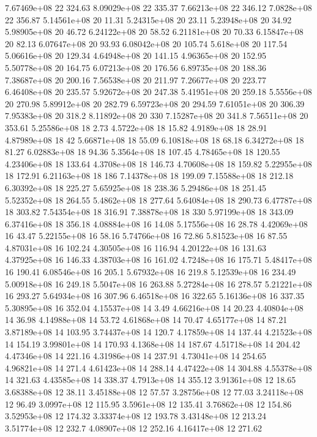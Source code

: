 7.67469e+08 22 324.63
8.09029e+08 22 335.37
7.66213e+08 22 346.12
7.0828e+08 22 356.87
5.14561e+08 20 11.31
5.24315e+08 20 23.11
5.23948e+08 20 34.92
5.98905e+08 20 46.72
6.24122e+08 20 58.52
6.21181e+08 20 70.33
6.15847e+08 20 82.13
6.07647e+08 20 93.93
6.08042e+08 20 105.74
5.618e+08 20 117.54
5.06616e+08 20 129.34
4.64948e+08 20 141.15
4.96365e+08 20 152.95
5.50778e+08 20 164.75
6.07213e+08 20 176.56
6.89735e+08 20 188.36
7.38687e+08 20 200.16
7.56538e+08 20 211.97
7.26677e+08 20 223.77
6.46408e+08 20 235.57
5.92672e+08 20 247.38
5.41951e+08 20 259.18
5.5556e+08 20 270.98
5.89912e+08 20 282.79
6.59723e+08 20 294.59
7.61051e+08 20 306.39
7.95383e+08 20 318.2
8.11892e+08 20 330
7.15287e+08 20 341.8
7.56511e+08 20 353.61
5.25586e+08 18 2.73
4.5722e+08 18 15.82
4.9189e+08 18 28.91
4.87989e+08 18 42
5.66871e+08 18 55.09
6.10818e+08 18 68.18
6.34272e+08 18 81.27
6.02883e+08 18 94.36
5.3564e+08 18 107.45
4.78465e+08 18 120.55
4.23406e+08 18 133.64
4.3708e+08 18 146.73
4.70608e+08 18 159.82
5.22955e+08 18 172.91
6.21163e+08 18 186
7.14378e+08 18 199.09
7.15588e+08 18 212.18
6.30392e+08 18 225.27
5.65925e+08 18 238.36
5.29486e+08 18 251.45
5.52352e+08 18 264.55
5.4862e+08 18 277.64
5.64084e+08 18 290.73
6.47787e+08 18 303.82
7.54354e+08 18 316.91
7.38878e+08 18 330
5.97199e+08 18 343.09
6.37416e+08 18 356.18
4.08884e+08 16 14.08
5.17556e+08 16 28.78
4.42069e+08 16 43.47
5.22155e+08 16 58.16
5.74766e+08 16 72.86
5.81523e+08 16 87.55
4.87031e+08 16 102.24
4.30505e+08 16 116.94
4.20122e+08 16 131.63
4.37925e+08 16 146.33
4.38703e+08 16 161.02
4.7248e+08 16 175.71
5.48417e+08 16 190.41
6.08546e+08 16 205.1
5.67932e+08 16 219.8
5.12539e+08 16 234.49
5.00918e+08 16 249.18
5.5047e+08 16 263.88
5.27284e+08 16 278.57
5.21221e+08 16 293.27
5.64934e+08 16 307.96
6.46518e+08 16 322.65
5.16136e+08 16 337.35
5.30895e+08 16 352.04
4.15537e+08 14 3.49
4.66216e+08 14 20.23
4.40804e+08 14 36.98
4.14988e+08 14 53.72
4.61868e+08 14 70.47
4.65177e+08 14 87.21
3.87189e+08 14 103.95
3.74437e+08 14 120.7
4.17859e+08 14 137.44
4.21523e+08 14 154.19
3.99801e+08 14 170.93
4.1368e+08 14 187.67
4.51718e+08 14 204.42
4.47346e+08 14 221.16
4.31986e+08 14 237.91
4.73041e+08 14 254.65
4.96821e+08 14 271.4
4.61423e+08 14 288.14
4.47422e+08 14 304.88
4.55378e+08 14 321.63
4.43585e+08 14 338.37
4.7913e+08 14 355.12
3.91361e+08 12 18.65
3.68388e+08 12 38.11
3.45188e+08 12 57.57
3.28756e+08 12 77.03
3.24118e+08 12 96.49
3.0997e+08 12 115.95
3.5961e+08 12 135.41
3.76862e+08 12 154.86
3.52953e+08 12 174.32
3.33374e+08 12 193.78
3.43148e+08 12 213.24
3.51774e+08 12 232.7
4.08907e+08 12 252.16
4.16417e+08 12 271.62
